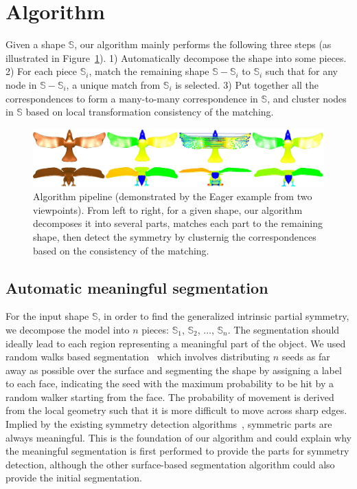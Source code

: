 \section{Algorithm}
\label{sec:alg}

Given a shape $\mathbb{S}$, our algorithm mainly performs the following three steps (as illustrated in Figure~\ref{fig:Eager}). 1) Automatically decompose the shape into some pieces. 2) For each piece $\mathbb{S}_i$, match the remaining shape $\mathbb{S}-\mathbb{S}_i$ to $\mathbb{S}_i$ such that for any node in  $\mathbb{S}-\mathbb{S}_i$, a unique match from $\mathbb{S}_i$ is selected. 3) Put together all the correspondences to form a many-to-many correspondence in $\mathbb{S}$, and cluster nodes in $\mathbb{S}$ based on local transformation consistency of the matching.

\begin{figure}[t!]
\centering
  \includegraphics[width=0.99\linewidth]{figures/pipe.pdf}
  \caption{Algorithm pipeline (demonstrated by the Eager example from two viewpoints).
  From left to right, for a given shape, our algorithm decomposes it into several parts, matches each part to the remaining shape, then detect the symmetry by clusternig the correspondences based on the consistency of the matching. }
\label{fig:Eager}
\end{figure}

\subsection{Automatic meaningful segmentation}
\label{subsec:segmentation}

For the input shape $\mathbb{S}$, in order to find the generalized intrinsic partial symmetry, we decompose the model into $n$ pieces: $\mathbb{S}_1$, $\mathbb{S}_2$, $\dots$, $\mathbb{S}_n$.
The segmentation should ideally lead to each region representing a meaningful part of the object. We used random walks based segmentation~\cite{lai2009} which involves distributing $n$ seeds as far away as possible over the surface and segmenting the shape by assigning a label to each face, indicating the seed with the maximum probability to be hit by a random walker starting from the face. The probability of movement is derived from the local geometry such that it is more difficult to move across sharp edges. Implied by the existing symmetry detection algorithms~\cite{xu2009,berner2011}, symmetric parts are always meaningful. This is the foundation of our algorithm and could explain why the meaningful segmentation is first performed to provide the parts for symmetry detection, although the other surface-based segmentation algorithm could also provide the initial segmentation.

